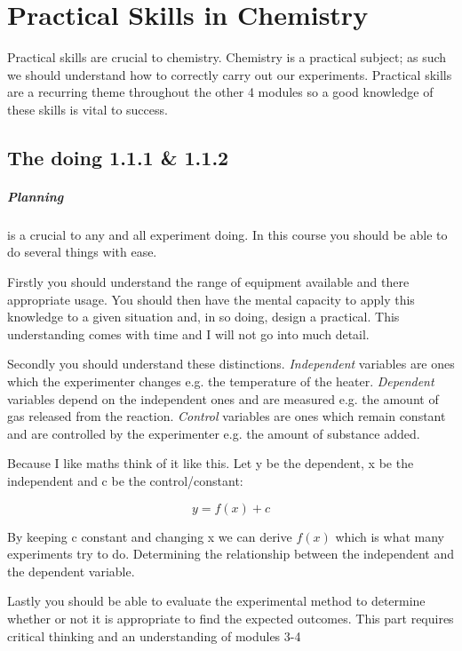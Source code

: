\chapter{Practical Skills in Chemistry}
	Practical skills are crucial to chemistry.
	Chemistry is a practical subject; as such we should understand how to correctly carry out our experiments.
	Practical skills are a recurring theme throughout the other 4 modules so a good knowledge of these skills is vital to success.

\section{The doing 1.1.1 \& 1.1.2}
	\paragraph{Planning} is a crucial to any and all experiment doing.
	In this course you should be able to do several things with ease.
	
	Firstly you should understand the range of equipment available and there appropriate usage.
	You should then have the mental capacity to apply this knowledge to a given situation and, in so doing, design a practical.
	This understanding comes with time and I will not go into much detail.
	
	Secondly you should understand these distinctions.
	\textit{Independent} variables are ones which the experimenter changes e.g. the temperature of the heater.
	\textit{Dependent} variables depend on the independent ones and are measured e.g. the amount of gas released from the reaction.
	\textit{Control} variables are ones which remain constant and are controlled by the experimenter e.g. the amount of substance added.
	
	Because I like maths think of it like this. Let y be the dependent, x be the independent and c be the control/constant:
	
	\begin{center}
	\[y= f(x) + c\]
	\end{center}
	
	By keeping c constant and changing x we can derive $f(x)$ which is what many experiments try to do.
	Determining the relationship between the independent and the dependent variable.
	
	Lastly you should be able to evaluate the experimental method to determine whether or not it is appropriate to find the expected outcomes.
	This part requires critical thinking and an understanding of modules 3-4
	
